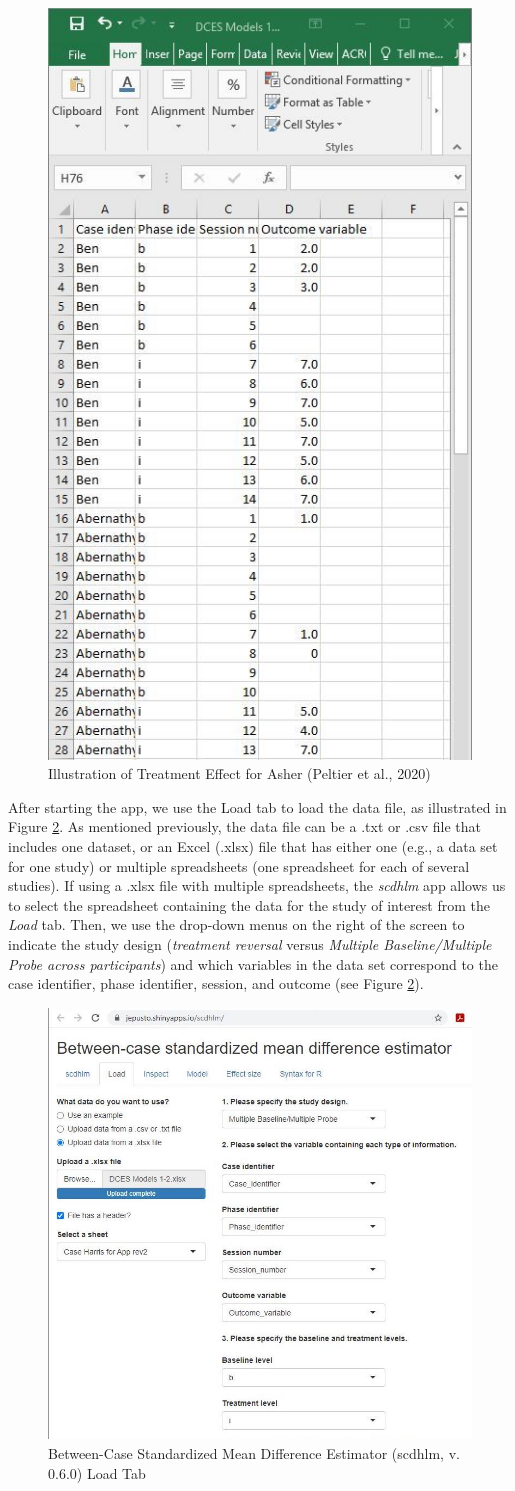 \documentclass[
]{book}
\begin{document}
\begin{figure}
\includegraphics[width=0.5\linewidth,height=0.75\textheight]{images/excel_Case1992} \caption{Illustration of Treatment Effect for Asher (Peltier et al., 2020)}\label{fig:Excel-Case-1992}
\end{figure}

After starting the app, we use the Load tab to load the data file, as illustrated in Figure \ref{fig:Load-Case-1992}. As mentioned previously, the data file can be a .txt or .csv file that includes one dataset, or an Excel (.xlsx) file that has either one (e.g., a data set for one study) or multiple spreadsheets (one spreadsheet for each of several studies). If using a .xlsx file with multiple spreadsheets, the \emph{scdhlm} app allows us to select the spreadsheet containing the data for the study of interest from the \emph{Load} tab. Then, we use the drop-down menus on the right of the screen to indicate the study design (\emph{treatment reversal} versus \emph{Multiple Baseline/Multiple Probe across participants}) and which variables in the data set correspond to the case identifier, phase identifier, session, and outcome (see Figure \ref{fig:Load-Case-1992}).

\begin{figure}
\includegraphics[width=0.5\linewidth]{images/app.load_Case1992} \caption{Between-Case Standardized Mean Difference Estimator (scdhlm, v. 0.6.0) Load Tab}\label{fig:Load-Case-1992}
\end{figure}
\end{document}
